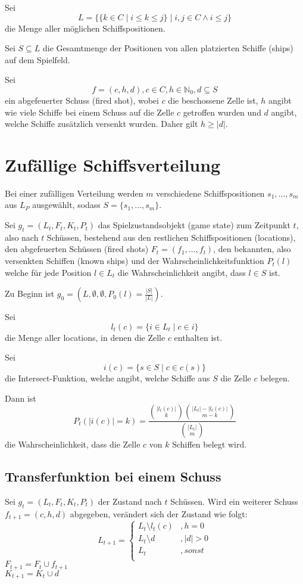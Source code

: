 \documentclass[a4paper,12pt]{llncs}
\newcommand{\N}{{\mathbb{N}}}
\numberwithin{equation}{section}
\begin{document}
Sei 
\[
L=
\{
\{
k
\in
C
\mid
i \leq k \leq j
\}
\mid
i,j \in C
\wedge
i \leq j
\}
\] die Menge aller möglichen Schiffspositionen.

Sei $S \subseteq L$ die Gesamtmenge der Positionen von allen platzierten Schiffe (ships) auf dem Spielfeld.

Sei
\[   
f = (c,h,d), c \in C, h \in \N_0, d \subseteq S
\]
ein abgefeuerter Schuss (fired shot), wobei $c$ die beschossene Zelle ist, $h$ angibt wie viele Schiffe bei einem Schuss auf die Zelle $c$ getroffen wurden und $d$ angibt, welche Schiffe zusätzlich versenkt wurden. Daher gilt $h \geq |d|$.


\section{Zufällige Schiffsverteilung}

Bei einer zufälligen Verteilung werden $m$ verschiedene Schiffspositionen $s_1, \dots, s_m$ aus $L_P$ ausgewählt, sodass $S=\{s_1, \dots, s_m\}$.

Sei $g_t=(L_t, F_t, K_t, P_t)$ das Spielzustandsobjekt (game state) zum Zeitpunkt $t$, also nach $t$ Schüssen, bestehend aus den restlichen Schiffspositionen (locations), den abgefeuerten Schüssen (fired shots) $F_t=(f_1, \dots, f_t)$, den bekannten, also versenkten Schiffen (known ships) und der Wahrscheinlichkeitsfunktion $P_t(l)$ welche für jede Position $l \in L_t$ die Wahrscheinlichkeit angibt, dass $l \in S$ ist.

Zu Beginn ist $g_0=(L, \emptyset, \emptyset, P_0(l)=\frac{|S|}{|L|})$.

Sei
\[
l_t(c)=
\{
i
\in
L_t
\mid
c
\in
i
\}
\]
die Menge aller locations, in denen die Zelle $c$ enthalten ist.


Sei
\[
i(c)=
\{
s
\in
S
\mid
c
\in
c(s)
\}
\]
die Intersect-Funktion, welche angibt, welche Schiffe aus $S$ die Zelle $c$ belegen.

Dann ist
\[
P_t(|i(c)|=k)=
\frac{\binom{|l_t(c)|}{k} \binom{|L_t| - |l_t(c)|}{m-k}}{\binom{|L_t|}{m}}
\]
die Wahrscheinlichkeit, dass die Zelle $c$ von $k$ Schiffen belegt wird.

\subsection{Transferfunktion bei einem Schuss}
Sei $g_t=(L_t, F_t, K_t, P_t)$ der Zustand nach $t$ Schüssen.
Wird ein weiterer Schuss $f_{t+1}=(c, h, d)$ abgegeben, verändert sich der Zustand wie folgt: \\
\[
L_{t+1}=
\begin{cases} 
      L_t \setminus l_t(c) &, h=0 \\
      L_t \setminus d &, |d|>0 \\
      L_t &, sonst \\
\end{cases}
\]
$F_{t+1}=F_t \cup f_{t+1}$ \\
$K_{t+1}=K_t \cup d$ \\
\end{document}
